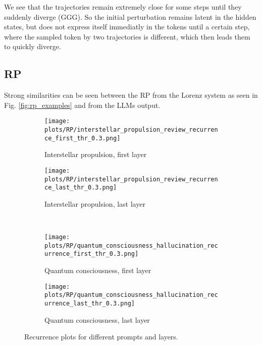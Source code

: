 \documentclass[a4paper,12pt]{article}
\begin{document}
We see that the trajectories remain extremely close for some steps until they suddenly diverge (GGG). So the initial perturbation remains latent in the hidden states, but does not express itself immediatly in the tokens until a certain step, where the sampled token by two trajectories is different, which then leads them to quickly diverge.

\subsection{RP}
\label{subsec:rp_results}

Strong similarities can be seen between the RP from the Lorenz \cite{DeterministicNonperiodicFlow} system as seen in Fig. \ref{fig:rp_examples} and from the LLMs output. %
\begin{figure}[H]
    \centering
    \begin{subfigure}[b]{0.48\textwidth}
        \centering
        \texttt{[image: plots/RP/interstellar\_propulsion\_review\_recurrence\_first\_thr\_0.3.png]}
        \caption{Interstellar propulsion, first layer}
    \end{subfigure}\hfill
    \begin{subfigure}[b]{0.48\textwidth}
        \centering
        \texttt{[image: plots/RP/interstellar\_propulsion\_review\_recurrence\_last\_thr\_0.3.png]}
        \caption{Interstellar propulsion, last layer}
    \end{subfigure}
    \\[0.5em]
    \begin{subfigure}[b]{0.48\textwidth}
        \centering
        \texttt{[image: plots/RP/quantum\_consciousness\_hallucination\_recurrence\_first\_thr\_0.3.png]}
        \caption{Quantum consciousness, first layer}
    \end{subfigure}\hfill
    \begin{subfigure}[b]{0.48\textwidth}
        \centering
        \texttt{[image: plots/RP/quantum\_consciousness\_hallucination\_recurrence\_last\_thr\_0.3.png]}
        \caption{Quantum consciousness, last layer}
    \end{subfigure}
    \caption{Recurrence plots for different prompts and layers.}
    \label{fig:rp_comparison_layers}           
\end{figure}
\end{document}
